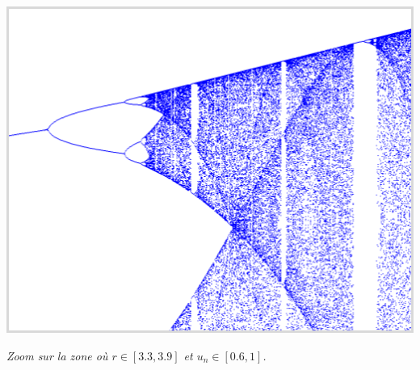 \documentclass[11pt,class=report,crop=false]{standalone}
\begin{document}
\begin{activite}[]
\bigskip

\begin{center}
\includegraphics[scale=\myscale,scale=0.3]{ecran-lyapunov-3}

\emph{Zoom sur la zone où $r \in [3.3,3.9]$ et $u_n \in [0.6,1]$.}
\end{center}

\end{activite}


\end{document}
